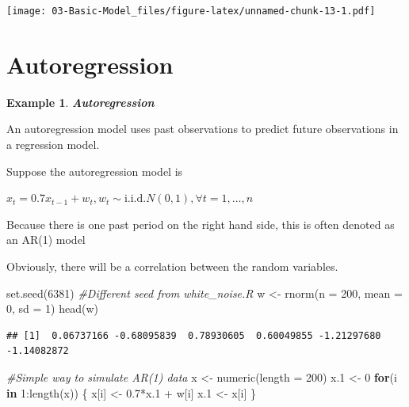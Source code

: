 \documentclass[
]{book}
\newenvironment{Shaded}{\begin{snugshade}}{\end{snugshade}}
\newcommand{\AttributeTok}[1]{\textcolor[rgb]{0.77,0.63,0.00}{#1}}
\newcommand{\CommentTok}[1]{\textcolor[rgb]{0.56,0.35,0.01}{\textit{#1}}}
\newcommand{\ControlFlowTok}[1]{\textcolor[rgb]{0.13,0.29,0.53}{\textbf{#1}}}
\newcommand{\DecValTok}[1]{\textcolor[rgb]{0.00,0.00,0.81}{#1}}
\newcommand{\FloatTok}[1]{\textcolor[rgb]{0.00,0.00,0.81}{#1}}
\newcommand{\FunctionTok}[1]{\textcolor[rgb]{0.00,0.00,0.00}{#1}}
\newcommand{\NormalTok}[1]{#1}
\newcommand{\OtherTok}[1]{\textcolor[rgb]{0.56,0.35,0.01}{#1}}
\newcommand{\SpecialCharTok}[1]{\textcolor[rgb]{0.00,0.00,0.00}{#1}}
\theoremstyle{definition}
\theoremstyle{definition}
\newtheorem{example}{Example}[chapter]
\theoremstyle{definition}
\theoremstyle{definition}
\theoremstyle{remark}
\begin{document}
\texttt{[image: 03-Basic-Model\_files/figure-latex/unnamed-chunk-13-1.pdf]}

\hypertarget{autoregression}{%
\section{Autoregression}\label{autoregression}}

\begin{example}
\textbf{\emph{Autoregression}}

An autoregression model uses past observations to predict future observations in a regression model.

Suppose the autoregression model is

\(x_t = 0.7x_{t-1} + w_t, w_t \sim \mathrm{i.i.d.} N(0,1) ,\forall t = 1, …, n\)

Because there is one past period on the right hand side, this is often denoted as an AR(1) model

Obviously, there will be a correlation between the random variables.
\end{example}

\begin{Shaded}
\begin{Highlighting}[]
\FunctionTok{set.seed}\NormalTok{(}\DecValTok{6381}\NormalTok{)  }\CommentTok{\#Different seed from white\_noise.R}
\NormalTok{w }\OtherTok{\textless{}{-}} \FunctionTok{rnorm}\NormalTok{(}\AttributeTok{n =} \DecValTok{200}\NormalTok{, }\AttributeTok{mean =} \DecValTok{0}\NormalTok{, }\AttributeTok{sd =} \DecValTok{1}\NormalTok{)}
\FunctionTok{head}\NormalTok{(w)}
\end{Highlighting}
\end{Shaded}

\begin{verbatim}
## [1]  0.06737166 -0.68095839  0.78930605  0.60049855 -1.21297680 -1.14082872
\end{verbatim}

\begin{Shaded}
\begin{Highlighting}[]
\CommentTok{\#Simple way to simulate AR(1) data}
\NormalTok{x }\OtherTok{\textless{}{-}} \FunctionTok{numeric}\NormalTok{(}\AttributeTok{length =} \DecValTok{200}\NormalTok{)}
\NormalTok{x}\FloatTok{.1} \OtherTok{\textless{}{-}} \DecValTok{0}
\ControlFlowTok{for}\NormalTok{(i }\ControlFlowTok{in} \DecValTok{1}\SpecialCharTok{:}\FunctionTok{length}\NormalTok{(x)) \{}
\NormalTok{    x[i] }\OtherTok{\textless{}{-}} \FloatTok{0.7}\SpecialCharTok{*}\NormalTok{x}\FloatTok{.1} \SpecialCharTok{+}\NormalTok{ w[i]}
\NormalTok{    x}\FloatTok{.1} \OtherTok{\textless{}{-}}\NormalTok{ x[i]}
\NormalTok{  \}}
\end{Highlighting}
\end{Shaded}
\end{document}
